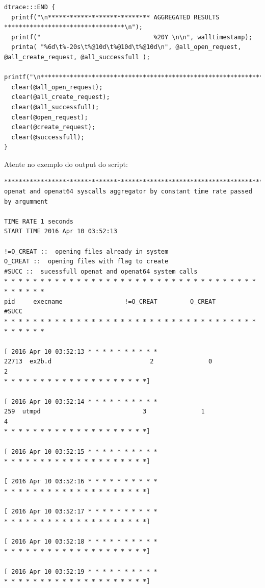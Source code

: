 \documentclass[a4paper]{article}
\begin{document}
\begin{lstlisting}
dtrace:::END {
  printf("\n**************************** AGGREGATED RESULTS *********************************\n");
  printf("                               %20Y \n\n", walltimestamp);
  printa( "%6d\t%-20s\t%@10d\t%@10d\t%@10d\n", @all_open_request, @all_create_request, @all_successfull );
  printf("\n*********************************************************************************\n");
  clear(@all_open_request);
  clear(@all_create_request);
  clear(@all_successfull);
  clear(@open_request);
  clear(@create_request);
  clear(@successfull);
}

\end{lstlisting}

Atente no exemplo do output do script:

\begin{lstlisting}[basicstyle=\scriptsize]
*********************************************************************************
openat and openat64 syscalls aggregator by constant time rate passed by argumment

TIME RATE 1 seconds 
START TIME 2016 Apr 10 03:52:13 

!=O_CREAT ::  opening files already in system
O_CREAT ::  opening files with flag to create
#SUCC ::  sucessfull openat and openat64 system calls
* * * * * * * * * * * * * * * * * * * * * * * * * * * * * * * * * * * * * * * * *
pid     execname                 !=O_CREAT         O_CREAT           #SUCC
* * * * * * * * * * * * * * * * * * * * * * * * * * * * * * * * * * * * * * * * *

[ 2016 Apr 10 03:52:13 * * * * * * * * * * 
22713  ex2b.d                           2               0               2
* * * * * * * * * * * * * * * * * * * *]

[ 2016 Apr 10 03:52:14 * * * * * * * * * * 
259  utmpd                            3               1               4
* * * * * * * * * * * * * * * * * * * *]

[ 2016 Apr 10 03:52:15 * * * * * * * * * * 
* * * * * * * * * * * * * * * * * * * *]

[ 2016 Apr 10 03:52:16 * * * * * * * * * * 
* * * * * * * * * * * * * * * * * * * *]

[ 2016 Apr 10 03:52:17 * * * * * * * * * * 
* * * * * * * * * * * * * * * * * * * *]

[ 2016 Apr 10 03:52:18 * * * * * * * * * * 
* * * * * * * * * * * * * * * * * * * *]

[ 2016 Apr 10 03:52:19 * * * * * * * * * * 
* * * * * * * * * * * * * * * * * * * *]


\end{lstlisting}
\end{document}

